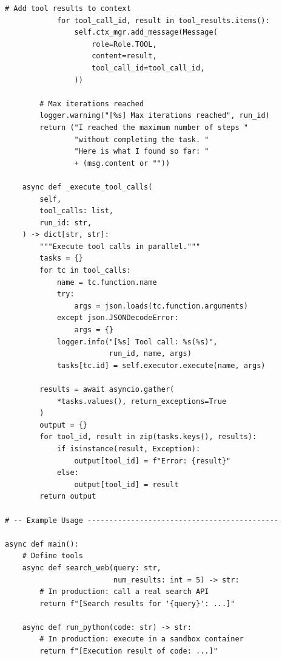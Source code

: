 \begin{lstlisting}[style=pythonstyle, caption={Production Agent Harness -- Core Implementation}]
            # Add tool results to context
            for tool_call_id, result in tool_results.items():
                self.ctx_mgr.add_message(Message(
                    role=Role.TOOL,
                    content=result,
                    tool_call_id=tool_call_id,
                ))

        # Max iterations reached
        logger.warning("[%s] Max iterations reached", run_id)
        return ("I reached the maximum number of steps "
                "without completing the task. "
                "Here is what I found so far: "
                + (msg.content or ""))

    async def _execute_tool_calls(
        self,
        tool_calls: list,
        run_id: str,
    ) -> dict[str, str]:
        """Execute tool calls in parallel."""
        tasks = {}
        for tc in tool_calls:
            name = tc.function.name
            try:
                args = json.loads(tc.function.arguments)
            except json.JSONDecodeError:
                args = {}
            logger.info("[%s] Tool call: %s(%s)",
                        run_id, name, args)
            tasks[tc.id] = self.executor.execute(name, args)

        results = await asyncio.gather(
            *tasks.values(), return_exceptions=True
        )
        output = {}
        for tool_id, result in zip(tasks.keys(), results):
            if isinstance(result, Exception):
                output[tool_id] = f"Error: {result}"
            else:
                output[tool_id] = result
        return output

# -- Example Usage --------------------------------------------

async def main():
    # Define tools
    async def search_web(query: str,
                         num_results: int = 5) -> str:
        # In production: call a real search API
        return f"[Search results for '{query}': ...]"

    async def run_python(code: str) -> str:
        # In production: execute in a sandbox container
        return f"[Execution result of code: ...]"


\end{lstlisting}
